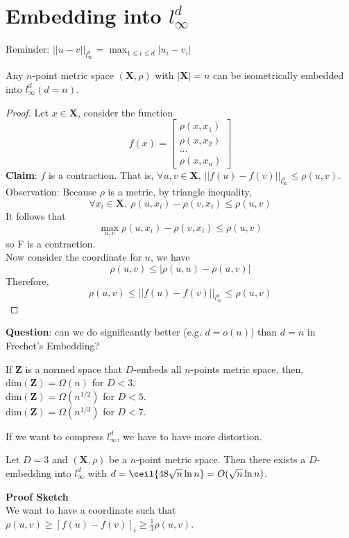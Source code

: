 \section{Embedding into $l_\infty^d$}
Reminder: $||u-v||_{l_\infty^d}=\max_{1\leq i \leq d} |u_i-v_i|$\\

\begin{theorem}[Frechet]
Any $n$-point metric space $(\mathbf{X}, \rho)$ with $|\mathbf{X}|=n$
can be isometrically embedded into $l_\infty^d (d=n)$.  
\end{theorem}
\begin{proof}
Let $x \in \mathbf{X}$, consider the function 
\[
f(x)=
\begin{bmatrix}
    \rho (x,x_1)\\
    \rho (x,x_2)\\
    ...\\
    \rho (x,x_n)
\end{bmatrix}
\]
\textbf{Claim}: $f$ is a contraction. That is, $\forall u,v \in
\mathbf{X}$, $||f(u)-f(v)||_{l_\infty^d} \leq \rho (u,v)$.\\ 
Observation: Because $\rho$ is a metric, by triangle inequality, 
\[
\forall x_i \in \mathbf{X},\ \rho (u,x_i) - \rho (v,x_i) \leq \rho
(u,v) 
\]
It follows that 
\[
\max_{u,v} \rho (u,x_i) - \rho (v,x_i) \leq \rho (u,v)\]
so F is a contraction.\\
Now consider the coordinate for $u$, we have 
\[
\rho (u,v) \leq | \rho (u,u) - \rho (u,v) |
\]
Therefore,
\[
\rho (u,v) \leq ||f(u)-f(v)||_{l_\infty^d} \leq \rho (u,v)
\]
\end{proof}
\textbf{Question}: can we do significantly better (e.g. $d=o(n)$) than
$d=n$ in Frechet's Embedding? 

\begin{theorem}
If $\mathbf{Z}$ is a normed space that $D$-embeds all $n$-points
metric space, then,\\ dim$(\mathbf{Z})=\Omega (n)$ for $D<3$.\\ 
dim$(\mathbf{Z})=\Omega (n^{1/2})$ for $D<5$.\\
dim$(\mathbf{Z})=\Omega (n^{1/3})$ for $D<7$.\\
\end{theorem}
If we want to compress $l_\infty^d$, we have to have more distortion.

\begin{theorem}
Let $D=3$ and $(\mathbf{X},\rho)$ be a $n$-point metric space. Then
there exists a $D$-embedding into $l_\infty^d$ with
$d=\ceil{48\sqrt{n}\ln n}=O(\sqrt{n}\ln n)$. 
\end{theorem}
\textbf{Proof Sketch}\\
We want to have a coordinate such that $\rho(u,v) \geq [f(u)-f(v)]_i
\geq \frac{1}{3}\rho(u,v)$. 

